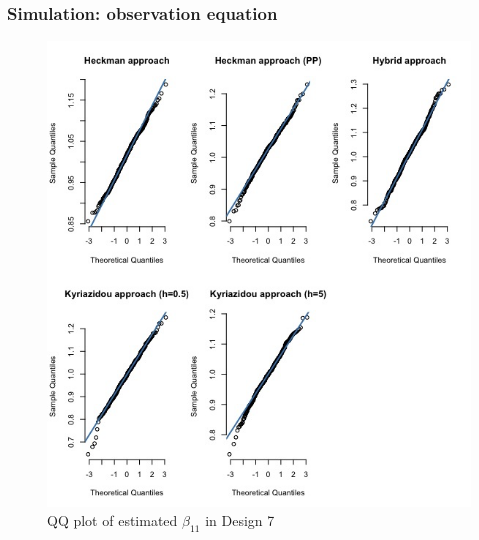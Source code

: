       \begin{frame}
        \frametitle{Simulation: observation equation}
      \begin{figure}[htbp]
        \centerline{\includegraphics[scale=.3]{content/Figures/QQ_beta_11_Design7.png}}
        \caption{\footnotesize{QQ plot of estimated $\beta_{11}$ in Design 7}}
        \label{QQ_beta_11_Design7}
      \end{figure}
\end{frame}